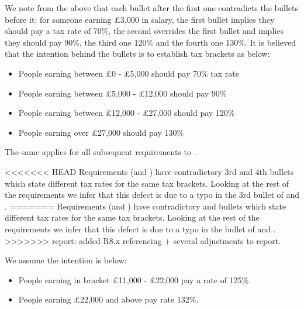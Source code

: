 We note from the above that each bullet after the first one contradicts the bullets before it: for someone earning £3,000 in salary, the first bullet implies they should pay a tax rate of 70\%, the second overrides the first bullet and implies they should pay 90\%, the third one 120\% and the fourth one 130\%. It is believed that the intention behind the bullets is to establish tax brackets as below: 
\begin{itemize}[noitemsep]
	\item People earning between £0 - £5,000 should pay 70\% tax rate 
	\item People earning between £5,000 - £12,000 should pay 90\%
	\item People earning between £12,000 - £27,000 should pay 120\%
	\item People earning over £27,000 should pay 130\%
\end{itemize}
The same applies for all subsequent requirements \REightSix \space to \REightTwelve. 

<<<<<<< HEAD
Requirements (\REightSix \space and \REightSeven) have contradictory 3rd and 4th bullets which state different tax rates for the same tax brackets. Looking at the rest of the requirements we infer that this defect is due to a typo in the 3rd bullet of \REightSix \space and \REightSeven. 
=======
Requirements (\REightSix \space and \REightSeven) have contradictory  and  bullets which state different tax rates for the same tax brackets. Looking at the rest of the requirements we infer that this defect is due to a typo in the  bullet of \REightSix \space and \REightSeven. 
>>>>>>> report: added R8.x referencing + several adjustments to report.

We assume the intention is below: 
\begin{itemize}[noitemsep]
	\item People earning in bracket £11,000 - £22,000 pay a rate of 125\%.
	\item People earning £22,000 and above pay rate 132\%.
\end{itemize}

